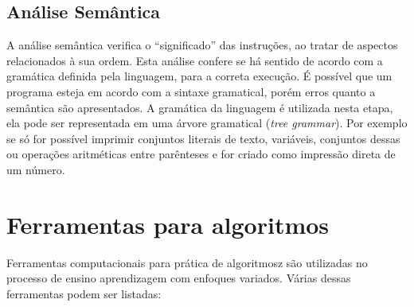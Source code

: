 \subsection{Análise Semântica}

A análise semântica verifica o ``significado'' das instruções, ao tratar de aspectos relacionados à sua ordem. Esta análise confere se há sentido de acordo com a gramática definida pela linguagem, para a correta execução. É possível que um programa esteja em acordo com a sintaxe gramatical, porém erros quanto a semântica são apresentados. A gramática da linguagem é utilizada nesta etapa, ela pode ser representada em uma árvore gramatical (\textit{tree grammar}). Por exemplo se só for possível imprimir conjuntos literais de texto, variáveis, conjuntos dessas ou operações aritméticas entre parênteses e for criado como impressão direta de um número.

\section{Ferramentas para algoritmos}

Ferramentas computacionais para prática de algoritmosz são utilizadas no processo de ensino aprendizagem com enfoques variados. Várias dessas ferramentas podem ser listadas:

